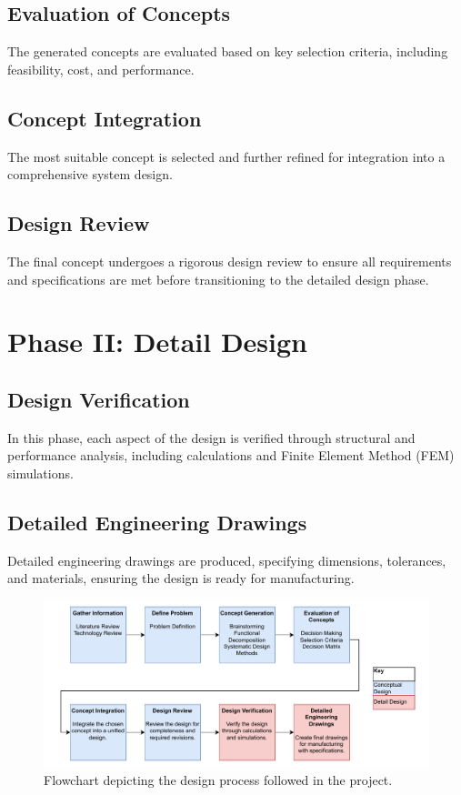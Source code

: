 \subsection{Evaluation of Concepts}
The generated concepts are evaluated based on key selection criteria, including feasibility, cost, and performance.

\subsection{Concept Integration}
The most suitable concept is selected and further refined for integration into a comprehensive system design.

\subsection{Design Review}
The final concept undergoes a rigorous design review to ensure all requirements and specifications are met before transitioning to the detailed design phase.

\section{Phase II: Detail Design}

\subsection{Design Verification}
In this phase, each aspect of the design is verified through structural and performance analysis, including calculations and Finite Element Method (FEM) simulations.

\subsection{Detailed Engineering Drawings}
Detailed engineering drawings are produced, specifying dimensions, tolerances, and materials, ensuring the design is ready for manufacturing.

\begin{figure}[H]
    \centering
    \includegraphics[width=1\textwidth]{figs/DesignMethodologyFlow.pdf} %
    \caption{Flowchart depicting the design process followed in the project.}
    \label{fig:design_process_flowchart}
\end{figure}


